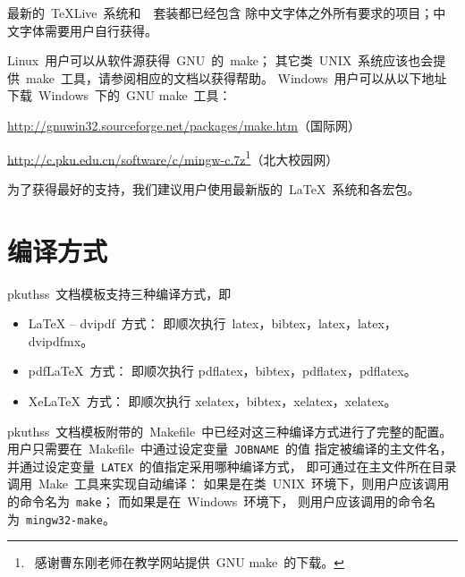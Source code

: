 	最新的~\TeX{}Live~系统和~\CTeX~套装都已经包含%
	除中文字体之外所有要求的项目；中文字体需要用户自行获得。

	Linux~用户可以从软件源获得~GNU~的~make；
	其它类~UNIX~系统应该也会提供~make~工具，请参阅相应的文档以获得帮助。
	Windows~用户可以从以下地址下载~Windows~下的~GNU make~工具：

	\url{http://gnuwin32.sourceforge.net/packages/make.htm}（国际网）
	\vspace{-0.1em}\par
	\url{http://c.pku.edu.cn/software/c/mingw-c.7z}\footnote%
	{\ 感谢曹东刚老师在教学网站提供~GNU make~的下载。}（北大校园网）

	为了获得最好的支持，我们建议用户使用最新版的~\LaTeX{}~系统和各宏包。

	\section{编译方式}

	pkuthss~文档模板支持三种编译方式，即
	\begin{itemize}\denseenum
	  \item \LaTeX{} -- dvipdf~方式：
		即顺次执行~latex，bibtex，latex，latex，dvipdfmx。
	  \item pdf\LaTeX{}~方式：
		即顺次执行 pdflatex，bibtex，pdflatex，pdflatex。
	  \item Xe\LaTeX{}~方式：
		即顺次执行 xelatex，bibtex，xelatex，xelatex。
	\end{itemize}

	pkuthss~文档模板附带的~Makefile~中已经对这三种编译方式进行了完整的配置。
	用户只需要在~Makefile~中通过设定变量~\verb|JOBNAME|~的值%
	指定被编译的主文件名，
	并通过设定变量~\verb|LATEX|~的值指定采用哪种编译方式，
	即可通过在主文件所在目录调用~Make~工具来实现自动编译：
	如果是在类~UNIX~环境下，则用户应该调用的命令名为~\verb|make|；
	而如果是在~Windows~环境下，
	则用户应该调用的命令名为~\verb|mingw32-make|。

